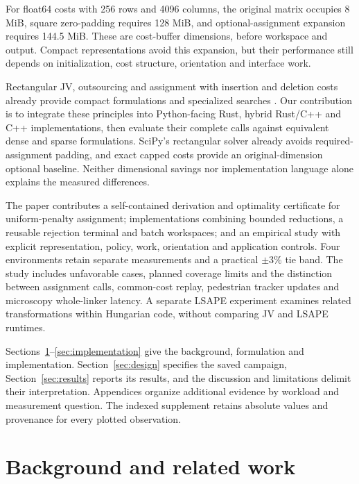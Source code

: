 \documentclass[11pt,a4paper]{article}
\begin{document}
For float64 costs with 256 rows and 4096 columns, the original matrix occupies 8 MiB, square zero-padding requires 128 MiB, and optional-assignment expansion requires 144.5 MiB. These are cost-buffer dimensions, before workspace and output. Compact representations avoid this expansion, but their performance still depends on initialization, cost structure, orientation and interface work.

Rectangular JV, outsourcing and assignment with insertion and deletion costs already provide compact formulations and specialized searches \cite{jonker1987,volgenant1996,bijsterbosch2010,vanderwiel1997,crouse2016,bougleux2016,jones2017,bougleux2020}. Our contribution is to integrate these principles into Python-facing Rust, hybrid Rust/C++ and C++ implementations, then evaluate their complete calls against equivalent dense and sparse formulations. SciPy's rectangular solver already avoids required-assignment padding, and exact capped costs provide an original-dimension optional baseline. Neither dimensional savings nor implementation language alone explains the measured differences.

The paper contributes a self-contained derivation and optimality certificate for uniform-penalty assignment; implementations combining bounded reductions, a reusable rejection terminal and batch workspaces; and an empirical study with explicit representation, policy, work, orientation and application controls. Four environments retain separate measurements and a practical $\pm3\%$ tie band. The study includes unfavorable cases, planned coverage limits and the distinction between assignment calls, common-cost replay, pedestrian tracker updates and microscopy whole-linker latency. A separate LSAPE experiment examines related transformations within Hungarian code, without comparing JV and LSAPE runtimes.

Sections~\ref{sec:background}--\ref{sec:implementation} give the background, formulation and implementation. Section~\ref{sec:design} specifies the saved campaign, Section~\ref{sec:results} reports its results, and the discussion and limitations delimit their interpretation. Appendices organize additional evidence by workload and measurement question. The indexed supplement retains absolute values and provenance for every plotted observation.

\FloatBarrier
\section{Background and related work}\label{sec:background}
\end{document}

